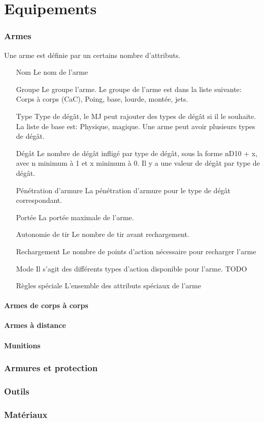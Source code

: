 \part{Equipements}

\section{Armes}
Une arme est définie par un certains nombre d'attributs.
\begin{itemize}
\item[Nom] Le nom de l'arme
\item[Groupe]Le groupe l'arme. Le groupe de l'arme est dans la liste suivante: Corps à corps (CaC), Poing, base, lourde, montée, jets.
\item[Type] Type de dégât, le MJ peut rajouter des types de dégât si il le souhaite. La liste de base est: Physique, magique. Une arme peut avoir plusieurs types de dégât.
\item[Dégât] Le nombre de dégât infligé par type de dégât, sous la forme nD10 + x, avec n minimum à 1 et x minimum à 0. Il y a une valeur de dégât par type de dégât. 
\item[Pénétration d'armure] La pénétration d'armure pour le type de dégât correspondant. 
\item[Portée] La portée maximale de l'arme.
\item[Autonomie de tir] Le nombre de tir avant rechargement.
\item[Rechargement] Le nombre de points d'action nécessaire pour recharger l'arme
\item[Mode] Il s'agit des différents types d'action disponible pour l'arme. TODO
\item[Règles spéciale] L'ensemble des attributs spéciaux de l'arme
\end{itemize}
\subsection{Armes de corps à corps}
\subsection{Armes à distance}
\subsection{Munitions}
\section{Armures et protection}
\section{Outils}
\section{Matériaux}
